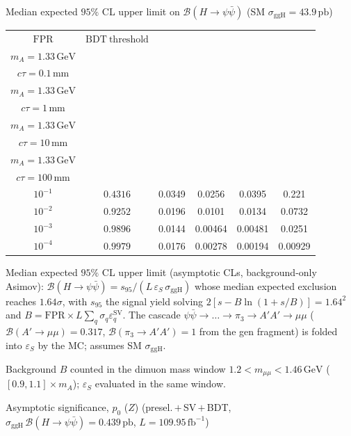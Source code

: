 \documentclass[10pt,a4paper]{article}
\begin{document}
{\vspace{12pt}

Median expected $95\%$ CL upper limit on $\mathcal{B}(H\to\psi\bar{\psi})$ (SM $\sigma_{\mathrm{ggH}}=43.9\,\mathrm{pb}$)

\begin{tabular}{cccccc}
\toprule
$\mathrm{FPR}$ & $\mathrm{BDT\ threshold}$ & \shortstack{$m_{\pi}=4\,\mathrm{GeV}$\\$m_{A}=1.33\,\mathrm{GeV}$\\$c\tau=0.1\,\mathrm{mm}$} & \shortstack{$m_{\pi}=4\,\mathrm{GeV}$\\$m_{A}=1.33\,\mathrm{GeV}$\\$c\tau=1\,\mathrm{mm}$} & \shortstack{$m_{\pi}=4\,\mathrm{GeV}$\\$m_{A}=1.33\,\mathrm{GeV}$\\$c\tau=10\,\mathrm{mm}$} & \shortstack{$m_{\pi}=4\,\mathrm{GeV}$\\$m_{A}=1.33\,\mathrm{GeV}$\\$c\tau=100\,\mathrm{mm}$} \\
\midrule
$10^{-1}$ & $0.4316$ & 0.0349 & 0.0256 & 0.0395 & 0.221\\
$10^{-2}$ & $0.9252$ & 0.0196 & 0.0101 & 0.0134 & 0.0732\\
$10^{-3}$ & $0.9896$ & 0.0144 & 0.00464 & 0.00481 & 0.0251\\
$10^{-4}$ & $0.9979$ & 0.0176 & 0.00278 & 0.00194 & 0.00929\\
\bottomrule
\end{tabular}

{\small Median expected $95\%$ CL upper limit (asymptotic CLs, background-only Asimov): $\mathcal{B}(H\to\psi\bar{\psi})=s_{95}/(L\,\varepsilon_S\,\sigma_{\mathrm{ggH}})$ whose median expected exclusion reaches $1.64\sigma$, with $s_{95}$ the signal yield solving $2[s-B\ln(1{+}s/B)]=1.64^2$ and $B=\mathrm{FPR}\times L\sum_q\sigma_q\varepsilon_q^{\mathrm{SV}}$. The cascade $\psi\bar{\psi}\to\ldots\to\pi_3\to A'A'\to\mu\mu$ ($\mathcal{B}(A'\to\mu\mu)=0.317$, $\mathcal{B}(\pi_3\to A'A')=1$ from the gen fragment) is folded into $\varepsilon_S$ by the MC; assumes SM $\sigma_{\mathrm{ggH}}$.}

{\small Background $B$ counted in the dimuon mass window $1.2<m_{\mu\mu}<1.46\,\mathrm{GeV}$ ($[0.9,1.1]\times m_A$); $\varepsilon_S$ evaluated in the same window.}

\vspace{12pt}

Asymptotic significance, $p_0$ ($Z$) (presel.\,$+$\,SV\,$+$\,BDT, $\sigma_{\mathrm{ggH}}\,\mathcal{B}(H\to\psi\bar{\psi})=0.439\,\mathrm{pb}$, $L=109.95\,\mathrm{fb}^{-1}$)

}
\end{document}
